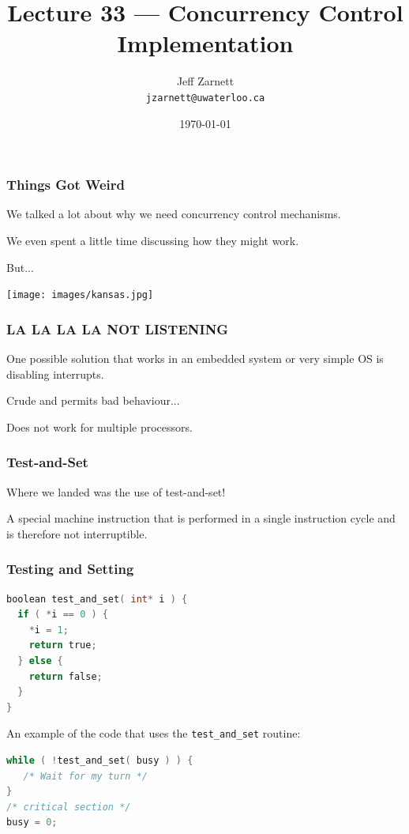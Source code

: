 


\title{Lecture 33 --- Concurrency Control Implementation }

\author{Jeff Zarnett \\ \small \texttt{jzarnett@uwaterloo.ca}}
\date{\today}




\begin{frame}
  \titlepage

 \end{frame}

\begin{frame}
\frametitle{Things Got Weird}

We talked a lot about why we need concurrency control mechanisms.

We even spent a little time discussing how they might work.

But...

\begin{center}
	\texttt{[image: images/kansas.jpg]}
\end{center}

\end{frame}

\begin{frame}
\frametitle{LA LA LA LA NOT LISTENING}

One possible solution that works in an embedded system or very simple OS is disabling interrupts. 

Crude and permits bad behaviour...

Does not work for multiple processors.

\end{frame}

\begin{frame}
\frametitle{Test-and-Set}

Where we landed was the use of test-and-set!

A special machine instruction that is performed in a single instruction cycle and is therefore not interruptible.

\end{frame}

\begin{frame}[fragile]
\frametitle{Testing and Setting}

\begin{lstlisting}[language=C]
boolean test_and_set( int* i ) {
  if ( *i == 0 ) {
    *i = 1;
    return true;
  } else {
    return false;
  }
}
\end{lstlisting}

An example of the code that uses the \texttt{test\_and\_set} routine:

\begin{lstlisting}[language=C]
while ( !test_and_set( busy ) ) {
   /* Wait for my turn */
}
/* critical section */
busy = 0;
\end{lstlisting}

\end{frame}

